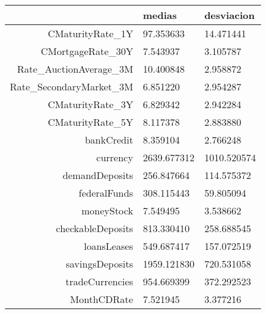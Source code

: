 \documentclass[11pt]{article}
\begin{document}
    \begin{tabular}{r|ll}
  & medias & desviacion\\
\hline
	CMaturityRate\_1Y &   97.353633 &   14.471441\\
	CMortgageRate\_30Y &    7.543937 &    3.105787\\
	Rate\_AuctionAverage\_3M &   10.400848 &    2.958872\\
	Rate\_SecondaryMarket\_3M &    6.851220 &    2.954287\\
	CMaturityRate\_3Y &    6.829342 &    2.942284\\
	CMaturityRate\_5Y &    8.117378 &    2.883880\\
	bankCredit &    8.359104 &    2.766248\\
	currency & 2639.677312 & 1010.520574\\
	demandDeposits &  256.847664 &  114.575372\\
	federalFunds &  308.115443 &   59.805094\\
	moneyStock &    7.549495 &    3.538662\\
	checkableDeposits &  813.330410 &  258.688545\\
	loansLeases &  549.687417 &  157.072519\\
	savingsDeposits & 1959.121830 &  720.531058\\
	tradeCurrencies &  954.669399 &  372.292523\\
	MonthCDRate &    7.521945 &    3.377216\\
\end{tabular}
\end{document}
